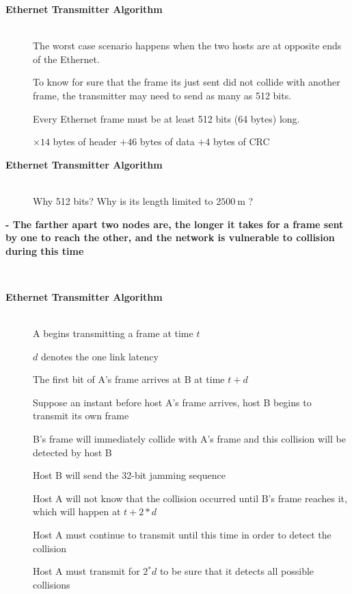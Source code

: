\begin{description}
\os{\newpage}\item[{\rot\bf  Ethernet Transmitter Algorithm }]~\\[-3ex]

\bi
  \ite The worst case scenario happens when the two hosts are at opposite ends of the Ethernet.

  \ite To know for sure that the frame its just sent did not collide with another frame, the transmitter may need to send as many as 512 bits.

\ei
\bi
 \ite Every Ethernet frame must be at least 512 bits (64 bytes) long.
 \ei


$\times 14$ bytes of header $+46$ bytes of data $+4$ bytes of CRC


\os{\newpage}\item[{\rot\bf  Ethernet Transmitter Algorithm }]~\\[-3ex]

\bi
  \ite Why 512 bits?
\ei
\bi
 \ite Why is its length limited to $2500 \mathrm{~m}$ ?
 \ei



\os{\newpage}\item[{\rot\bf  - The farther apart two nodes are, the longer it takes for a frame sent by one to reach the other, and the network is vulnerable to collision during this time }]~\\[-3ex]


\os{\newpage}\item[{\rot\bf  Ethernet Transmitter Algorithm }]~\\[-3ex]

\bi
  \ite A begins transmitting a frame at time $t$

  \ite $d$ denotes the one link latency

  \ite The first bit of A's frame arrives at B at time $t+d$

  \ite Suppose an instant before host A's frame arrives, host B begins to transmit its own frame

  \ite B's frame will immediately collide with A's frame and this collision will be detected by host B

  \ite Host B will send the 32-bit jamming sequence

  \ite Host A will not know that the collision occurred until B's frame reaches it, which will happen at $t+2 * d$

  \ite Host A must continue to transmit until this time in order to detect the collision

  \ite Host A must transmit for $2{ }^{*} d$ to be sure that it detects all possible collisions


\end{description}
